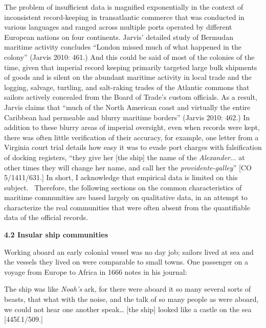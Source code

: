 \begin{styleStandard}
The problem of insufficient data is magnified exponentially in the context of inconsistent record-keeping in transatlantic commerce that was conducted in various languages and ranged across multiple ports operated by different European nations on four continents. Jarvis’ detailed study of Bermudan maritime activity concludes “London missed much of what happened in the colony” (Jarvis 2010: 461.) And this could be said of most of the colonies of the time, given that imperial record keeping primarily targeted large bulk shipments of goods and is silent on the abundant maritime activity in local trade and the logging, salvage, turtling, and salt-raking trades of the Atlantic commons that sailors actively concealed from the Board of Trade’s custom officials. As a result, Jarvis claims that “much of the North American coast and virtually the entire Caribbean had permeable and blurry maritime borders” (Jarvis 2010: 462.) In addition to these blurry areas of imperial oversight, even when records were kept, there was often little verification of their accuracy, for example, one letter from a Virginia court trial details how easy it was to evade port charges with falsification of docking registers, “they give her [the ship] the name of the \textit{Alexander}... at other times they will change her name, and call her the \textit{providente-galley}” [CO 5/1411/631.] In short, I acknowledge that empirical data is limited on this subject. \ Therefore, the following sections on the common characteristics of maritime communities are based largely on qualitative data, in an attempt to characterize the real communities that were often absent from the quantifiable data of the official records.
\end{styleStandard}


\begin{styleStandard}
\textbf{4.2 Insular ship communities}
\end{styleStandard}


\begin{styleStandard}
Working aboard an early colonial vessel was no day job; sailors lived at sea and the vessels they lived on were comparable to small towns. One passenger on a voyage from Europe to Africa in 1666 notes in his journal: 
\end{styleStandard}


\begin{styleStandard}
The ship was like \textit{Noah’s} ark, for there were aboard it so many several sorts of beasts, that what with the noise, and the talk of so many people as were aboard, we could not hear one another speak… [the ship] looked like a castle on the sea [445f.1/509.]
\end{styleStandard}


